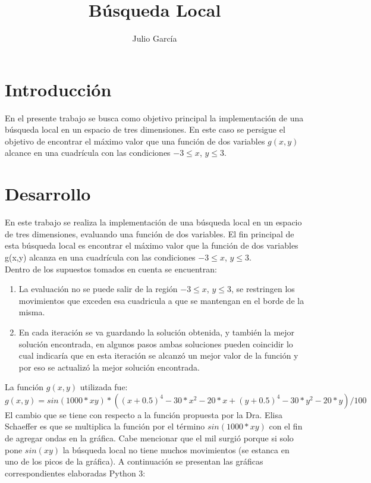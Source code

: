 \documentclass{article}
\title {Búsqueda Local}
\author{Julio Garc\'ia}
\begin{document}
	\renewcommand{\listtablename}{Índice de tablas}
	\renewcommand{\tablename}{Cuadro}
	\maketitle
	
	\section{Introducción}
	En el presente trabajo se busca como objetivo principal la implementación de una búsqueda local en un espacio de tres dimensiones. En este caso se persigue el objetivo de encontrar el máximo valor que una función de dos variables $g(x,y)$ alcance en una cuadrícula con las condiciones $-3 \leq x$, $y \leq 3$. 

	\section{Desarrollo}
	En este trabajo se realiza la implementación de una búsqueda local en un espacio de tres dimensiones, evaluando una función de dos variables. El fin principal de esta búsqueda local es encontrar el máximo valor que la función de dos variables g(x,y) alcanza en una cuadrícula con las condiciones  $-3 \leq x$, $y \leq 3$.\\
	Dentro de los supuestos tomados en cuenta se encuentran:
	\begin{enumerate}
		\item La evaluación no se puede salir de la región  $-3 \leq x$, $y \leq 3$, se restringen los movimientos que exceden esa cuadricula a que se mantengan en el borde de la misma.
		\item En cada iteración se va guardando la solución obtenida, y también la mejor solución encontrada, en algunos pasos ambas soluciones pueden coincidir lo cual indicaría que en esta iteración se alcanzó un mejor valor de la función y por eso se actualizó la mejor solución encontrada.
	\end{enumerate}
	La función $g(x,y)$ utilizada fue: \\
	
	$g(x,y)= sin(1000*xy)*((x + 0.5)^4 - 30 * x^2 - 20 * x + (y + 0.5)^4 - 30 * y^2 - 20 * y )/100$  \\

	
	El cambio que se tiene con respecto a la función propuesta por la Dra. Elisa Schaeffer es que se multiplica la función por el término $sin(1000*xy)$ con el fin de agregar ondas en la gráfica. Cabe mencionar que el mil surgió porque si solo pone $sin(xy)$ la búsqueda local no tiene muchos movimientos (se estanca en uno de los picos de la gráfica). A continuación se presentan las gráficas correspondientes elaboradas Python 3:\\
\end{document}
